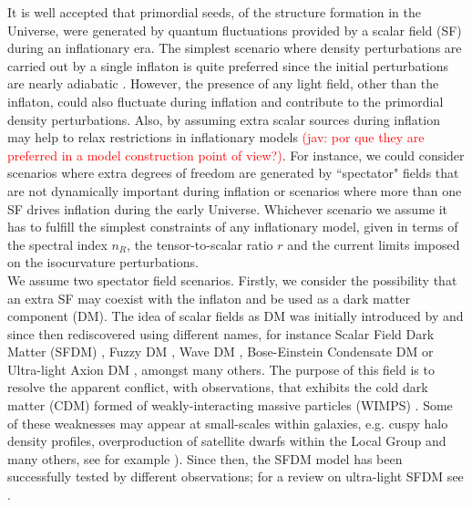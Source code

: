 \documentclass[amssymb,twocolumn,prd,nofootinbib,showpacs]{revtex4-1}
\newcommand{\jav}[1]{\textcolor{red}{(jav: #1)}}
\begin{document}
It is well accepted that primordial seeds, of the structure formation in the Universe, were generated by quantum 
fluctuations provided by a scalar field (SF) during an inflationary era. 
The simplest scenario where density perturbations are carried out by a single inflaton is quite preferred since the initial 
perturbations are nearly adiabatic \cite{const1,const2,planck}. However, the presence of any light field, other than the inflaton, 
could also fluctuate during inflation and contribute to the primordial density perturbations. 
%
Also, by assuming extra scalar sources during inflation may help to relax restrictions in inflationary models
\jav{por que they are preferred in a model construction point of view?}.
For instance, we could consider scenarios where extra degrees of freedom are generated by ``spectator" 
fields that are not dynamically important during inflation or scenarios where more than one SF drives inflation 
during the early Universe. 
%
Whichever scenario we assume it has to fulfill the simplest constraints of any inflationary model, given in terms of the 
spectral index $n_R$, the tensor-to-scalar ratio $r$ and the current limits imposed on the isocurvature perturbations. 
\\

We assume two spectator field scenarios.
%
Firstly, we consider the possibility that an extra SF may coexist with the inflaton and be used as a dark matter component (DM). 
The idea of scalar fields as DM was initially introduced by \cite{SF1} and since then rediscovered 
using different names, for instance Scalar Field Dark Matter  (SFDM)  \cite{SF2},  Fuzzy  DM  \cite{SF3}, 
Wave DM \cite{SF4,SF5}, Bose-Einstein Condensate DM \cite{SF6} or Ultra-light Axion DM \cite{SF7,SF8}, amongst many others. 
%
The purpose of this field is to resolve the apparent conflict, with observations, that exhibits the
cold dark matter (CDM) formed of weakly-interacting massive particles (WIMPS) \cite{LCDM1,LCDM2}. 
Some of these weaknesses may appear at small-scales within galaxies, e.g. cuspy halo density profiles, overproduction of 
satellite dwarfs within the Local Group and many others, see for example \cite{problem1,problem2,problem3,problem4,problem5}). 
Since then, the SFDM model has been successfully tested by different observations;  
for a review on ultra-light SFDM see \cite{SF9,SF10,SF11,SF12}. 
\end{document}
